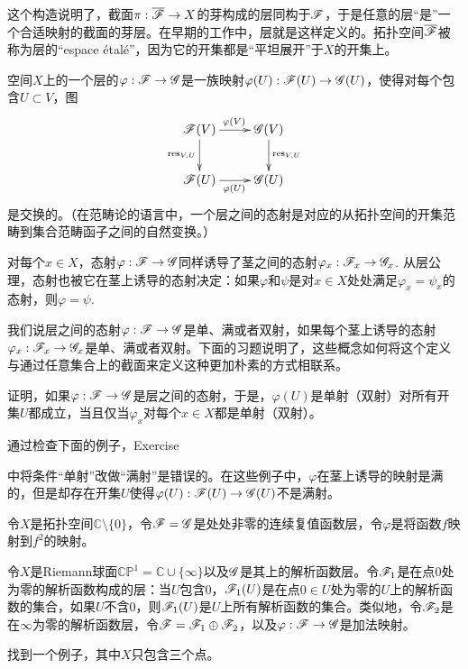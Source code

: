 这个构造说明了，截面$\pi:\overline{\mathscr{F}}\to X$的芽构成的层同构于$\mathscr{F}$，于是任意的层“是”一个合适映射的截面的芽层。在早期的工作中，层就是这样定义的。拓扑空间$\overline{\mathscr{F}}$被称为层的``espace \'{e}tal\'{e}''，因为它的开集都是“平坦展开”于$X$的开集上。

空间$X$上的一个层的$\varphi:\mathscr{F}\to\mathscr{G}$是一族映射$\varphi(U):\mathscr{F}(U)\to \mathscr{G}(U)$，使得对每个包含$U\subset V$，图
\[
	\xymatrix{
	\ff(V)\ar[r]^{\varphi(V)}\ar[d]_{\res_{V,U}}&\scrg(V)\ar[d]^{\res_{V,U}}\\
	\ff(U)\ar[r]_{\varphi(U)}&\scrg(U)
	}
\]
是交换的。（在范畴论的语言中，一个层之间的态射是对应的从拓扑空间的开集范畴到集合范畴函子之间的自然变换。）

对每个$x\in X$，态射$\varphi:\mathscr{F}\to\mathscr{G}$同样诱导了茎之间的态射$\varphi_x:\mathscr{F}_x\to\mathscr{G}_x$. 从层公理，态射也被它在茎上诱导的态射决定：如果$\varphi$和$\psi$是对$x\in X$处处满足$\varphi_x=\psi_x$的态射，则$\varphi=\psi$.

我们说层之间的态射$\varphi:\mathscr{F}\to\mathscr{G}$是单、满或者双射，如果每个茎上诱导的态射$\varphi_x:\mathscr{F}_x\to\mathscr{G}_x$是单、满或者双射。下面的习题说明了，这些概念如何将这个定义与通过任意集合上的截面来定义这种更加朴素的方式相联系。

\begin{exe}
	证明，如果$\varphi:\mathscr{F}\to\mathscr{G}$是层之间的态射，于是，$\varphi(U)$是单射（双射）对所有开集$U$都成立，当且仅当$\varphi_x$对每个$x\in X$都是单射（双射）。
\end{exe}

\begin{exe}
	通过检查下面的例子，Exercise {{\addtocounter{thm}{-1}}\thethm{\addtocounter{thm}{1}}}中将条件“单射”改做“满射”是错误的。在这些例子中，$\varphi$在茎上诱导的映射是满的，但是却存在开集$U$使得$\varphi(U):\mathscr{F}(U)\to \mathscr{G}(U)$不是满射。
	\begin{compactenum}[(a)]
	\item 令$X$是拓扑空间$\mathbb{C}\setminus \{0\}$，令$\mathscr{F}=\mathscr{G}$是处处非零的连续复值函数层，令$\varphi$是将函数$f$映射到$f^2$的映射。

	\item 令$X$是Riemann球面$\mathbb{CP}^1=\mathbb{C}\cup\{\infty\}$以及$\mathscr{G}$是其上的解析函数层。令$\mathscr{F}_1$是在点$0$处为零的解析函数构成的层：当$U$包含$0$，$\mathscr{F}_1(U)$是在点$0\in U$处为零的$U$上的解析函数的集合，如果$U$不含$0$，则$\mathscr{F}_1(U)$是$U$上所有解析函数的集合。类似地，令$\mathscr{F}_2$是在$\infty$为零的解析函数层，令$\mathscr{F}=\mathscr{F}_1\oplus\mathscr{F}_2$，以及$\varphi:\mathscr{F}\to\mathscr{G}$是加法映射。

	\item 找到一个例子，其中$X$只包含三个点。
	\end{compactenum}
\end{exe}

